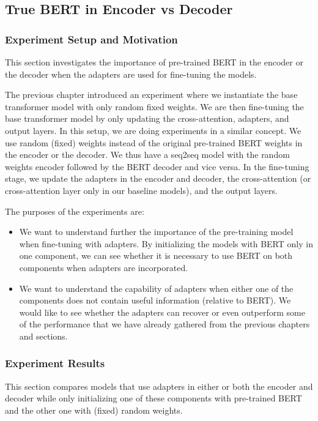 \subsection{True BERT in Encoder vs Decoder}
\label{sec:pospre}
\subsubsection{Experiment Setup and Motivation}
This section investigates the importance of pre-trained BERT in the encoder or the decoder when the adapters are used for fine-tuning the models.

The previous chapter introduced an experiment where we instantiate the base transformer model with only random fixed weights. We are then fine-tuning the base transformer model by only updating the cross-attention, adapters, and output layers. In this setup, we are doing experiments in a similar concept. We use random (fixed) weights instead of the original pre-trained BERT weights in the encoder or the decoder. We thus have a seq2seq model with the random weights encoder followed by the BERT decoder and vice versa. In the fine-tuning stage, we update the adapters in the encoder and decoder, the cross-attention (or cross-attention layer only in our baseline models), and the output layers.

The purposes of the experiments are:
\begin{itemize}
    \item We want to understand further the importance of the pre-training model when fine-tuning with adapters. By initializing the models with BERT only in one component, we can see whether it is necessary to use BERT on both components when adapters are incorporated.
    \item We want to understand the capability of adapters when either one of the components does not contain useful information (relative to BERT). We would like to see whether the adapters can recover or even outperform some of the performance that we have already gathered from the previous chapters and sections.
\end{itemize}

\subsubsection{Experiment Results}
This section compares models that use adapters in either or both the encoder and decoder while only initializing one of these components with pre-trained BERT and the other one with (fixed) random weights.

